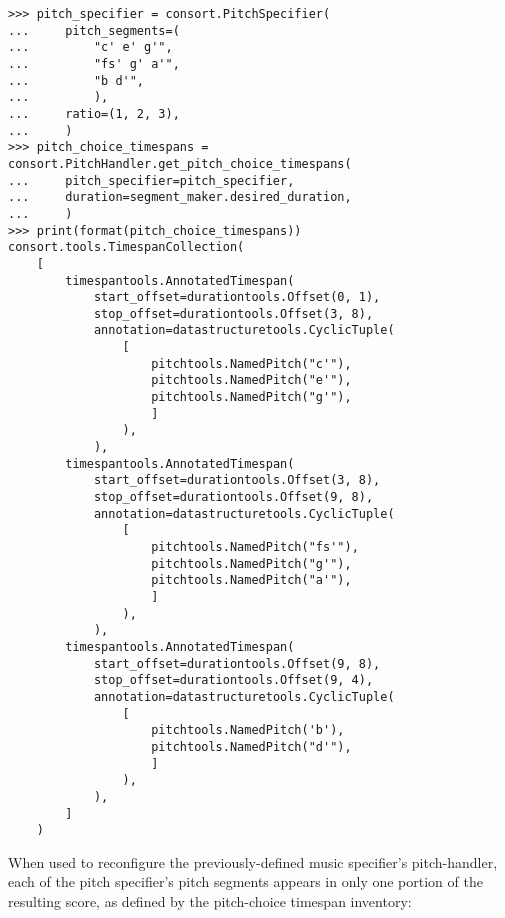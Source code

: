 \begin{abjadbookoutput}
\begin{singlespacing}
\vspace{-0.5\baselineskip}
\begin{lstlisting}
>>> pitch_specifier = consort.PitchSpecifier(
...     pitch_segments=(
...         "c' e' g'",
...         "fs' g' a'",
...         "b d'",
...         ),
...     ratio=(1, 2, 3),
...     )
>>> pitch_choice_timespans = consort.PitchHandler.get_pitch_choice_timespans(
...     pitch_specifier=pitch_specifier,
...     duration=segment_maker.desired_duration,
...     )
>>> print(format(pitch_choice_timespans))
consort.tools.TimespanCollection(
    [
        timespantools.AnnotatedTimespan(
            start_offset=durationtools.Offset(0, 1),
            stop_offset=durationtools.Offset(3, 8),
            annotation=datastructuretools.CyclicTuple(
                [
                    pitchtools.NamedPitch("c'"),
                    pitchtools.NamedPitch("e'"),
                    pitchtools.NamedPitch("g'"),
                    ]
                ),
            ),
        timespantools.AnnotatedTimespan(
            start_offset=durationtools.Offset(3, 8),
            stop_offset=durationtools.Offset(9, 8),
            annotation=datastructuretools.CyclicTuple(
                [
                    pitchtools.NamedPitch("fs'"),
                    pitchtools.NamedPitch("g'"),
                    pitchtools.NamedPitch("a'"),
                    ]
                ),
            ),
        timespantools.AnnotatedTimespan(
            start_offset=durationtools.Offset(9, 8),
            stop_offset=durationtools.Offset(9, 4),
            annotation=datastructuretools.CyclicTuple(
                [
                    pitchtools.NamedPitch('b'),
                    pitchtools.NamedPitch("d'"),
                    ]
                ),
            ),
        ]
    )
\end{lstlisting}
\end{singlespacing}
\end{abjadbookoutput}

\noindent When used to reconfigure the previously-defined music specifier's
pitch-handler, each of the pitch specifier's pitch segments appears in only one
portion of the resulting score, as defined by the pitch-choice timespan
inventory:

\begin{comment}
<abjad>[stylesheet=../consort.ily]
music_specifier = new(
    music_specifier,
    pitch_handler__pitch_specifier=pitch_specifier,
    )
music_setting = consort.MusicSetting(
    timespan_maker=timespan_maker,
    v1=music_specifier,
    v2=music_specifier,
    )
segment_maker = new(segment_maker, settings=[music_setting])
show(segment_maker, verbose=False)
</abjad>
\end{comment}

